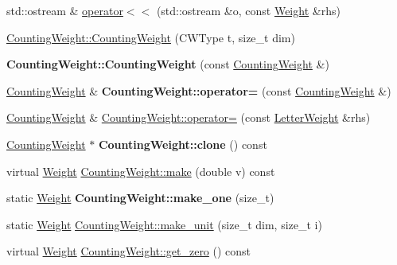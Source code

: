 \begin{DoxyCompactItemize}
std\+::ostream \& \mbox{\hyperlink{group__weight_ga5fa6fc187426e2cc6aa40f7acddf8455}{operator$<$$<$}} (std\+::ostream \&o, const \mbox{\hyperlink{classWeight}{Weight}} \&rhs)
\item 
\mbox{\hyperlink{group__weight_gaff2b14e164c777c04be1a0e3c73b71fa}{Counting\+Weight\+::\+Counting\+Weight}} (C\+W\+Type t, size\+\_\+t dim)
\item 
\mbox{\label{group__weight_ga1c356f04569b90215755f5d1289c78aa}} 
{\bfseries Counting\+Weight\+::\+Counting\+Weight} (const \mbox{\hyperlink{classCountingWeight}{Counting\+Weight}} \&)
\item 
\mbox{\label{group__weight_gaa78f8a12ada406ba6a331acc42baa052}} 
\mbox{\hyperlink{classCountingWeight}{Counting\+Weight}} \& {\bfseries Counting\+Weight\+::operator=} (const \mbox{\hyperlink{classCountingWeight}{Counting\+Weight}} \&)
\item 
\mbox{\hyperlink{classCountingWeight}{Counting\+Weight}} \& \mbox{\hyperlink{group__weight_gabde05f9a8f2eb526e5154c4f3480205b}{Counting\+Weight\+::operator=}} (const \mbox{\hyperlink{classLetterWeight}{Letter\+Weight}} \&rhs)
\item 
\mbox{\label{group__weight_ga7e6061ad27a65ee071647866da6a971f}} 
\mbox{\hyperlink{classCountingWeight}{Counting\+Weight}} $\ast$ {\bfseries Counting\+Weight\+::clone} () const
\item 
virtual \mbox{\hyperlink{classWeight}{Weight}} \mbox{\hyperlink{group__weight_ga1d225aef0e74c70d8ae73164de4f56e2}{Counting\+Weight\+::make}} (double v) const
\item 
\mbox{\label{group__weight_ga6963921223bbd482ce8454ffa6d6fda5}} 
static \mbox{\hyperlink{classWeight}{Weight}} {\bfseries Counting\+Weight\+::make\+\_\+one} (size\+\_\+t)
\item 
static \mbox{\hyperlink{classWeight}{Weight}} \mbox{\hyperlink{group__weight_ga12cda7b4188f3917d256808fd42c3364}{Counting\+Weight\+::make\+\_\+unit}} (size\+\_\+t dim, size\+\_\+t i)
\item 
\mbox{\label{group__weight_ga76eb9cd401bbeba9450469a889dfb7eb}} 
virtual \mbox{\hyperlink{classWeight}{Weight}} \mbox{\hyperlink{group__weight_ga76eb9cd401bbeba9450469a889dfb7eb}{Counting\+Weight\+::get\+\_\+zero}} () const

\end{DoxyCompactItemize}
